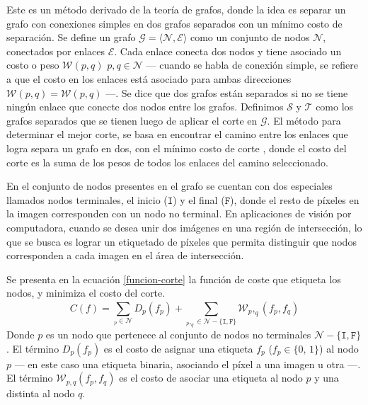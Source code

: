 Este es un método derivado de la teoría de grafos, donde la idea es separar un grafo con conexiones simples en dos grafos separados con un mínimo costo de separación. Se define un grafo $\mathcal{G} = \langle \mathcal{N}, \mathcal{E} \rangle$ como un conjunto de nodos $\mathcal{N}$, conectados por enlaces $\mathcal{E}$. Cada enlace conecta dos nodos y tiene asociado un costo o peso $\mathcal{W}(p, q) \,\, p,q \in \mathcal{N}$ --- cuando se habla de conexión simple, se refiere a que el costo en los enlaces está asociado para ambas direcciones $\mathcal{W}(p, q) = \mathcal{W}(p, q)$ ---. Se dice que dos grafos están separados si no se tiene ningún enlace que conecte dos nodos entre los grafos. Definimos $\mathcal{S}$ y $\mathcal{T}$ como los grafos separados que se tienen luego de aplicar el corte en $\mathcal{G}$. El método para determinar el mejor corte, se basa en encontrar el camino entre los enlaces que logra separa un grafo en dos, con el mínimo costo de corte \cite{graph-cut}, donde el costo del corte es la suma de los pesos de todos los enlaces del camino seleccionado.

En el conjunto de nodos presentes en el grafo se cuentan con dos especiales llamados nodos terminales, el inicio ($\mathtt{I}$) y el final ($\mathtt{F}$), donde el resto de píxeles en la imagen corresponden con un nodo no terminal. En aplicaciones de visión por computadora, cuando se desea unir dos imágenes en una región de intersección, lo que se busca es lograr un etiquetado de píxeles que permita distinguir que nodos corresponden a cada imagen en el área de intersección.

Se presenta en la ecuación \ref{funcion-corte} la función de coste que etiqueta los nodos, y minimiza el costo del corte.
\begin{equation}
C(f) = \sum_{_p\in \mathcal{N}}^{} D_p(f_p) + \sum_{_p,_q \in \mathcal{N} - \{\mathtt{I},\mathtt{F}\}}^{} \mathcal{W}_p,_q (f_p, f_q)
\label{funcion-corte}
\end{equation}
Donde $p$ es un nodo que pertenece al conjunto de nodos no terminales $\mathcal{N} - \{\mathtt{I},\mathtt{F}\}$. El término $D_p(f_p)$ es el costo de asignar una etiqueta $f_p$ ($f_p \in \{0,\,1\}$) al nodo $p$ --- en este caso una etiqueta binaria, asociando el píxel a una imagen u otra ---. El término $\mathcal{W}_{p,q} (f_p, f_q)$ es el costo de asociar una etiqueta al nodo $p$ y una distinta al nodo $q$.

